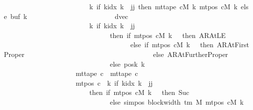 \begin{isabellebody}
\ \ \ \ \ \ \ \ \ \ \ \ \ \ \ \ \ \ \ \ \ \ \ \ \ {\isacharparenleft}{\kern0pt}{\isasymlambda}k{\isachardot}{\kern0pt}\ if\ k{\isacharunderscore}{\kern0pt}idx\ k\ {\isacharless}{\kern0pt}\ jj\ then\ mt{\isacharunderscore}{\kern0pt}tape\ cM\ k\ {\isacharparenleft}{\kern0pt}mt{\isacharunderscore}{\kern0pt}pos\ cM\ k{\isacharparenright}{\kern0pt}\ else\ buf{}\ k{\isacharparenright}{\kern0pt}{\isacharcomma}{\kern0pt}\isanewline
\ \ \ \ \ \ \ \ \ \ \ \ \ \ \ \ \ \ \ \ \ \ \ \ \ dvec{\isacharcomma}{\kern0pt}\isanewline
\ \ \ \ \ \ \ \ \ \ \ \ \ \ \ \ \ \ \ \ \ \ \ \ \ {\isacharparenleft}{\kern0pt}{\isasymlambda}k{\isachardot}{\kern0pt}\ if\ k{\isacharunderscore}{\kern0pt}idx\ k\ {\isacharless}{\kern0pt}\ jj\isanewline
\ \ \ \ \ \ \ \ \ \ \ \ \ \ \ \ \ \ \ \ \ \ \ \ \ \ \ \ \ \ \ then\ {\isacharparenleft}{\kern0pt}if\ mt{\isacharunderscore}{\kern0pt}pos\ cM\ k\ {\isacharequal}{\kern0pt}\ {}\ then\ AR{\isacharunderscore}{\kern0pt}AtLE\isanewline
\ \ \ \ \ \ \ \ \ \ \ \ \ \ \ \ \ \ \ \ \ \ \ \ \ \ \ \ \ \ \ \ \ \ \ \ \ else\ if\ mt{\isacharunderscore}{\kern0pt}pos\ cM\ k\ {\isacharequal}{\kern0pt}\ {}\ then\ AR{\isacharunderscore}{\kern0pt}AtFirstProper\isanewline
\ \ \ \ \ \ \ \ \ \ \ \ \ \ \ \ \ \ \ \ \ \ \ \ \ \ \ \ \ \ \ \ \ \ \ \ \ else\ AR{\isacharunderscore}{\kern0pt}AtFurtherProper{\isacharparenright}{\kern0pt}\isanewline
\ \ \ \ \ \ \ \ \ \ \ \ \ \ \ \ \ \ \ \ \ \ \ \ \ \ \ \ \ \ \ else\ posk{}\ k{\isacharparenright}{\kern0pt}{\isacharparenright}{\kern0pt}\isanewline
\ \ \ \ \ \ \ \ \ \ \ \ \ \ \ \ \ \ \ \ {\isasymand}\ mt{\isacharunderscore}{\kern0pt}tape\ c\ {\isacharequal}{\kern0pt}\ mt{\isacharunderscore}{\kern0pt}tape\ c{}\isanewline
\ \ \ \ \ \ \ \ \ \ \ \ \ \ \ \ \ \ \ \ {\isasymand}\ mt{\isacharunderscore}{\kern0pt}pos\ c\ {\isacharequal}{\kern0pt}\ {\isacharparenleft}{\kern0pt}{\isasymlambda}k{\isachardot}{\kern0pt}\ if\ k{\isacharunderscore}{\kern0pt}idx\ k\ {\isacharless}{\kern0pt}\ jj\isanewline
\ \ \ \ \ \ \ \ \ \ \ \ \ \ \ \ \ \ \ \ \ \ \ \ \ then\ {\isacharparenleft}{\kern0pt}if\ mt{\isacharunderscore}{\kern0pt}pos\ cM\ k\ {\isacharequal}{\kern0pt}\ {}\ then\ Suc\ {}\isanewline
\ \ \ \ \ \ \ \ \ \ \ \ \ \ \ \ \ \ \ \ \ \ \ \ \ \ \ \ \ \ \ else\ sim{\isacharunderscore}{\kern0pt}pos\ {\isacharparenleft}{\kern0pt}block{\isacharunderscore}{\kern0pt}width\ {\isacharparenleft}{\kern0pt}{\isasymGamma}{\isacharunderscore}{\kern0pt}tm\ M{\isacharparenright}{\kern0pt}{\isacharparenright}{\kern0pt}\ {\isacharparenleft}{\kern0pt}mt{\isacharunderscore}{\kern0pt}pos\ cM\ k{\isacharparenright}{\kern0pt}\isanewline

\end{isabellebody}
